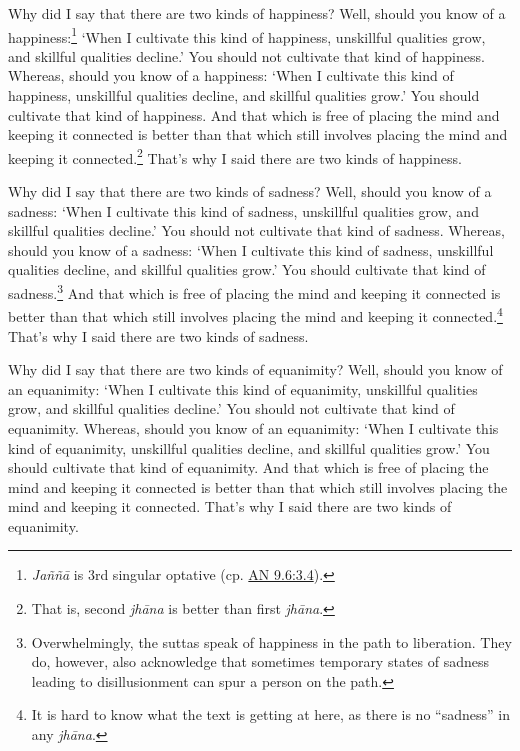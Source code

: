 \documentclass[12pt,openany]{book}%
\begin{document}
Why did I say that there are two kinds of happiness? Well, should you know of a happiness:\footnote{\textit{\textsanskrit{Jaññā}} is 3rd singular optative (cp. \href{https://suttacentral.net/an9.6/en/sujato\#3.4}{AN 9.6:3.4}). } ‘When I cultivate this kind of happiness, unskillful qualities grow, and skillful qualities decline.’ You should not cultivate that kind of happiness. Whereas, should you know of a happiness: ‘When I cultivate this kind of happiness, unskillful qualities decline, and skillful qualities grow.’ You should cultivate that kind of happiness. And that which is free of placing the mind and keeping it connected is better than that which still involves placing the mind and keeping it connected.\footnote{That is, second \textit{\textsanskrit{jhāna}} is better than first \textit{\textsanskrit{jhāna}}. } That’s why I said there are two kinds of happiness. 

Why did I say that there are two kinds of sadness? Well, should you know of a sadness: ‘When I cultivate this kind of sadness, unskillful qualities grow, and skillful qualities decline.’ You should not cultivate that kind of sadness. Whereas, should you know of a sadness: ‘When I cultivate this kind of sadness, unskillful qualities decline, and skillful qualities grow.’ You should cultivate that kind of sadness.\footnote{Overwhelmingly, the suttas speak of happiness in the path to liberation. They do, however, also acknowledge that sometimes temporary states of sadness leading to disillusionment can spur a person on the path. } And that which is free of placing the mind and keeping it connected is better than that which still involves placing the mind and keeping it connected.\footnote{It is hard to know what the text is getting at here, as there is no “sadness” in any \textit{\textsanskrit{jhāna}}. } That’s why I said there are two kinds of sadness. 

Why did I say that there are two kinds of equanimity? Well, should you know of an equanimity: ‘When I cultivate this kind of equanimity, unskillful qualities grow, and skillful qualities decline.’ You should not cultivate that kind of equanimity. Whereas, should you know of an equanimity: ‘When I cultivate this kind of equanimity, unskillful qualities decline, and skillful qualities grow.’ You should cultivate that kind of equanimity. And that which is free of placing the mind and keeping it connected is better than that which still involves placing the mind and keeping it connected. That’s why I said there are two kinds of equanimity. 
\end{document}
